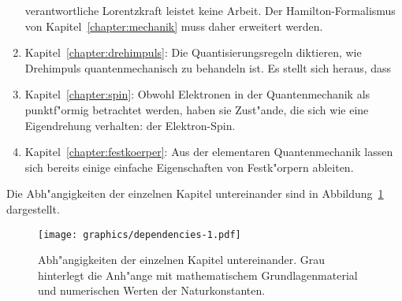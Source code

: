 \begin{enumerate}
verantwortliche Lorentzkraft leistet keine Arbeit.
Der Hamilton-Formalismus von Kapitel~\ref{chapter:mechanik} muss
daher erweitert werden.
\item Kapitel~\ref{chapter:drehimpuls}:
Die Quantisierungsregeln diktieren, wie Drehimpuls quantenmechanisch
zu behandeln ist. Es stellt sich heraus, dass 
\item Kapitel~\ref{chapter:spin}:
Obwohl Elektronen in der Quantenmechanik als punktf"ormig betrachtet
werden, haben sie Zust"ande, die sich wie eine Eigendrehung verhalten:
der Elektron-Spin.
\item Kapitel~\ref{chapter:festkoerper}:
Aus der elementaren Quantenmechanik lassen sich bereits einige
einfache Eigenschaften von Festk"orpern ableiten.
\end{enumerate}

Die Abh"angigkeiten der einzelnen Kapitel untereinander sind in
Abbildung~\ref{skript:dependencies} dargestellt.
\begin{figure}
\centering
\texttt{[image: graphics/dependencies-1.pdf]}
\caption{Abh"angigkeiten der einzelnen Kapitel untereinander.
Grau hinterlegt die Anh"ange mit mathematischem Grundlagenmaterial
und numerischen Werten der Naturkonstanten.
\label{skript:dependencies}}
\end{figure}



